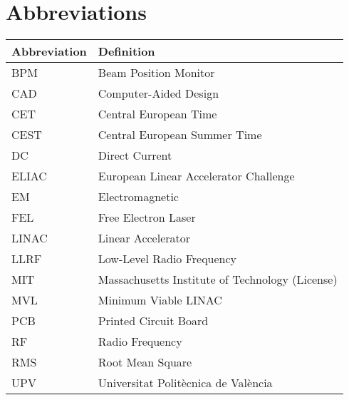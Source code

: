 
\section*{Abbreviations}

\begin{tabular}{ll}
\toprule
Abbreviation & Definition \\
\midrule
BPM & Beam Position Monitor \\
CAD & Computer-Aided Design \\
CET & Central European Time \\
CEST & Central European Summer Time \\
DC & Direct Current \\
ELIAC & European Linear Accelerator Challenge \\
EM & Electromagnetic \\
FEL & Free Electron Laser \\
LINAC & Linear Accelerator \\
LLRF & Low-Level Radio Frequency \\
MIT & Massachusetts Institute of Technology (License) \\
MVL & Minimum Viable LINAC \\
PCB & Printed Circuit Board \\
RF & Radio Frequency \\
RMS & Root Mean Square \\
UPV & Universitat Politècnica de València \\
\bottomrule
\end{tabular}